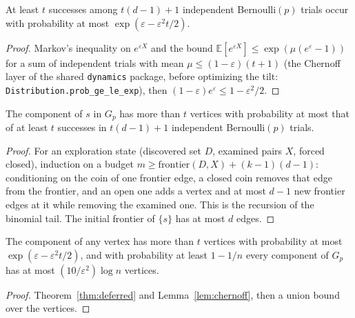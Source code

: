 \begin{lemma}\label{lem:chernoff}
\leanok{}
At least $t$ successes among $t(d-1)+1$ independent Bernoulli$(p)$ trials occur with probability
at most $\exp(\varepsilon - \varepsilon^2 t/2)$.
\end{lemma}
\begin{proof}\leanok
Markov's inequality on $e^{\varepsilon X}$ and the bound $\mathbb E[e^{\varepsilon X}] \le
\exp(\mu(e^{\varepsilon}-1))$ for a sum of independent trials with mean $\mu \le
(1-\varepsilon)(t+1)$ (the Chernoff layer of the shared \texttt{dynamics} package, before
optimizing the tilt: \texttt{Distribution.prob\_ge\_le\_exp}), then $(1-\varepsilon)e^{\varepsilon} \le 1 - \varepsilon^2/2$.
\end{proof}

\begin{theorem}\label{thm:deferred}
\leanok{}
The component of $s$ in $G_p$ has more than $t$ vertices with probability at most that of at
least $t$ successes in $t(d-1)+1$ independent Bernoulli$(p)$ trials.
\end{theorem}
\begin{proof}\leanok
For an exploration state (discovered set $D$, examined pairs $X$, forced closed), induction on a
budget $m \ge \mathrm{frontier}(D, X) + (k-1)(d-1)$: conditioning on the coin of one frontier edge,
a closed coin removes that edge from the frontier, and an open one adds a vertex and at most $d-1$
new frontier edges at it while removing the examined one. This is the recursion of the binomial
tail. The initial frontier of $\{s\}$ has at most $d$ edges.
\end{proof}

\begin{theorem}\label{thm:subcritical}
\leanok{}
The component of any vertex has more than $t$ vertices with probability at most
$\exp(\varepsilon - \varepsilon^2 t/2)$, and with probability at least $1 - 1/n$ every component of
$G_p$ has at most $(10/\varepsilon^2)\log n$ vertices.
\end{theorem}
\begin{proof}\leanok
Theorem~\ref{thm:deferred} and Lemma~\ref{lem:chernoff}, then a union bound over the vertices.
\end{proof}


